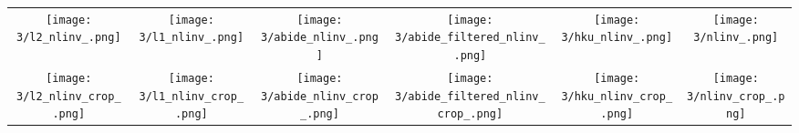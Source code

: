 \begin{tabular}{c @{\hskip 0pt} c @{\hskip 0pt} c @{\hskip 0pt} c @{\hskip 0pt} c @{\hskip 0pt} c}
    \texttt{[image: 3/l2\_nlinv\_.png]}&
    \texttt{[image: 3/l1\_nlinv\_.png]}&
    \texttt{[image: 3/abide\_nlinv\_.png]}&
    \texttt{[image: 3/abide\_filtered\_nlinv\_.png]}&
    \texttt{[image: 3/hku\_nlinv\_.png]}&
    \texttt{[image: 3/nlinv\_.png]}\\
    \texttt{[image: 3/l2\_nlinv\_crop\_.png]}&
    \texttt{[image: 3/l1\_nlinv\_crop\_.png]}&
    \texttt{[image: 3/abide\_nlinv\_crop\_.png]}&
    \texttt{[image: 3/abide\_filtered\_nlinv\_crop\_.png]}&
    \texttt{[image: 3/hku\_nlinv\_crop\_.png]}&
    \texttt{[image: 3/nlinv\_crop\_.png]}
\end{tabular}

